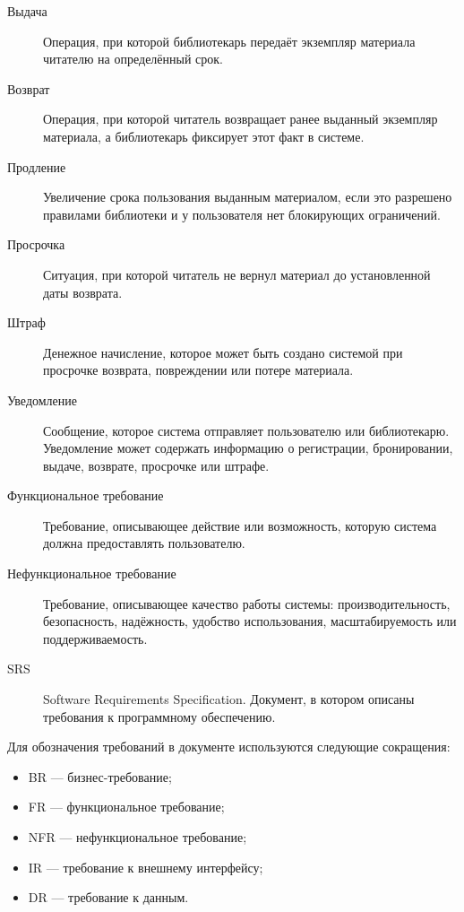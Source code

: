 \documentclass[12pt,a4paper]{article}
\begin{document}
\begin{description}
		\item[Выдача] Операция, при которой библиотекарь передаёт экземпляр материала
		читателю на определённый срок.
		
		\item[Возврат] Операция, при которой читатель возвращает ранее выданный
		экземпляр материала, а библиотекарь фиксирует этот факт в системе.
		
		\item[Продление] Увеличение срока пользования выданным материалом, если это
		разрешено правилами библиотеки и у пользователя нет блокирующих ограничений.
		
		\item[Просрочка] Ситуация, при которой читатель не вернул материал до
		установленной даты возврата.
		
		\item[Штраф] Денежное начисление, которое может быть создано системой при
		просрочке возврата, повреждении или потере материала.
		
		\item[Уведомление] Сообщение, которое система отправляет пользователю или
		библиотекарю. Уведомление может содержать информацию о регистрации,
		бронировании, выдаче, возврате, просрочке или штрафе.
		
		\item[Функциональное требование] Требование, описывающее действие или
		возможность, которую система должна предоставлять пользователю.
		
		\item[Нефункциональное требование] Требование, описывающее качество работы
		системы: производительность, безопасность, надёжность, удобство использования,
		масштабируемость или поддерживаемость.
		
		\item[SRS] Software Requirements Specification. Документ, в котором описаны
		требования к программному обеспечению.
	\end{description}
	
	Для обозначения требований в документе используются следующие сокращения:
	
	\begin{itemize}
		\item BR --- бизнес-требование;
		\item FR --- функциональное требование;
		\item NFR --- нефункциональное требование;
		\item IR --- требование к внешнему интерфейсу;
		\item DR --- требование к данным.
	\end{itemize}
	
\end{document}
